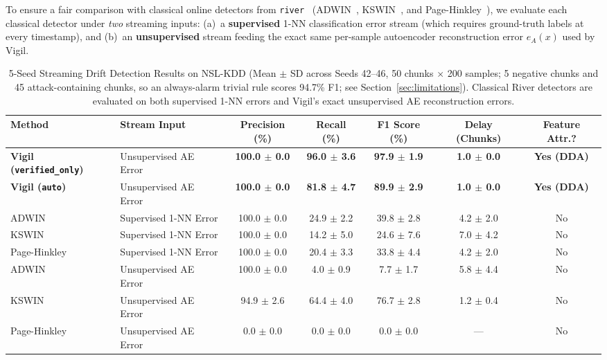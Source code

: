 \documentclass[10pt,conference]{IEEEtran}
\begin{document}
To ensure a fair comparison with classical online detectors from
\texttt{river}~\cite{montiel2021river} (ADWIN~\cite{bifet2007adwin},
KSWIN~\cite{raab2020kswin}, and Page-Hinkley~\cite{page1954continuous}), we
evaluate each classical detector under \emph{two} streaming inputs: (a)~a
\textbf{supervised} 1-NN classification error stream (which requires ground-truth
labels at every timestamp), and (b)~an \textbf{unsupervised} stream feeding the
exact same per-sample autoencoder reconstruction error $e_A(x)$ used by Vigil.

\begin{table}[!tp]
\caption{5-Seed Streaming Drift Detection Results on NSL-KDD (Mean $\pm$ SD across Seeds 42--46, 50 chunks $\times$ 200 samples; 5 negative chunks and 45 attack-containing chunks, so an always-alarm trivial rule scores 94.7\% F1; see Section~\ref{sec:limitations}).
  Classical River detectors are evaluated on both supervised 1-NN errors and Vigil's exact unsupervised AE reconstruction errors.}
\label{tab:nslkdd_results}
\centering
\footnotesize
\setlength{\tabcolsep}{5pt}
\begin{tabular}{llccccc}
\toprule
\textbf{Method} & \textbf{Stream Input} & \textbf{Precision (\%)} & \textbf{Recall (\%)} & \textbf{F1 Score (\%)} & \textbf{Delay (Chunks)} & \textbf{Feature Attr.?} \\
\midrule
\textbf{Vigil (\texttt{verified\_only})} & Unsupervised AE Error & \textbf{100.0 $\pm$ 0.0} & \textbf{96.0 $\pm$ 3.6} & \textbf{97.9 $\pm$ 1.9} & \textbf{1.0 $\pm$ 0.0} & \textbf{Yes (DDA)} \\
\textbf{Vigil (\texttt{auto})} & Unsupervised AE Error & \textbf{100.0 $\pm$ 0.0} & \textbf{81.8 $\pm$ 4.7} & \textbf{89.9 $\pm$ 2.9} & \textbf{1.0 $\pm$ 0.0} & \textbf{Yes (DDA)} \\
\midrule
ADWIN~\cite{bifet2007adwin} & Supervised 1-NN Error & 100.0 $\pm$ 0.0 & 24.9 $\pm$ 2.2 & 39.8 $\pm$ 2.8 & 4.2 $\pm$ 2.0 & No \\
KSWIN~\cite{raab2020kswin} & Supervised 1-NN Error & 100.0 $\pm$ 0.0 & 14.2 $\pm$ 5.0 & 24.6 $\pm$ 7.6 & 7.0 $\pm$ 4.2 & No \\
Page-Hinkley~\cite{page1954continuous} & Supervised 1-NN Error & 100.0 $\pm$ 0.0 & 20.4 $\pm$ 3.3 & 33.8 $\pm$ 4.4 & 4.2 $\pm$ 2.0 & No \\
\midrule
ADWIN~\cite{bifet2007adwin} & Unsupervised AE Error & 100.0 $\pm$ 0.0 & 4.0 $\pm$ 0.9 & 7.7 $\pm$ 1.7 & 5.8 $\pm$ 4.4 & No \\
KSWIN~\cite{raab2020kswin} & Unsupervised AE Error & 94.9 $\pm$ 2.6 & 64.4 $\pm$ 4.0 & 76.7 $\pm$ 2.8 & 1.2 $\pm$ 0.4 & No \\
Page-Hinkley~\cite{page1954continuous} & Unsupervised AE Error & 0.0 $\pm$ 0.0 & 0.0 $\pm$ 0.0 & 0.0 $\pm$ 0.0 & --- & No \\
\bottomrule
\end{tabular}
\end{table}
\end{document}
